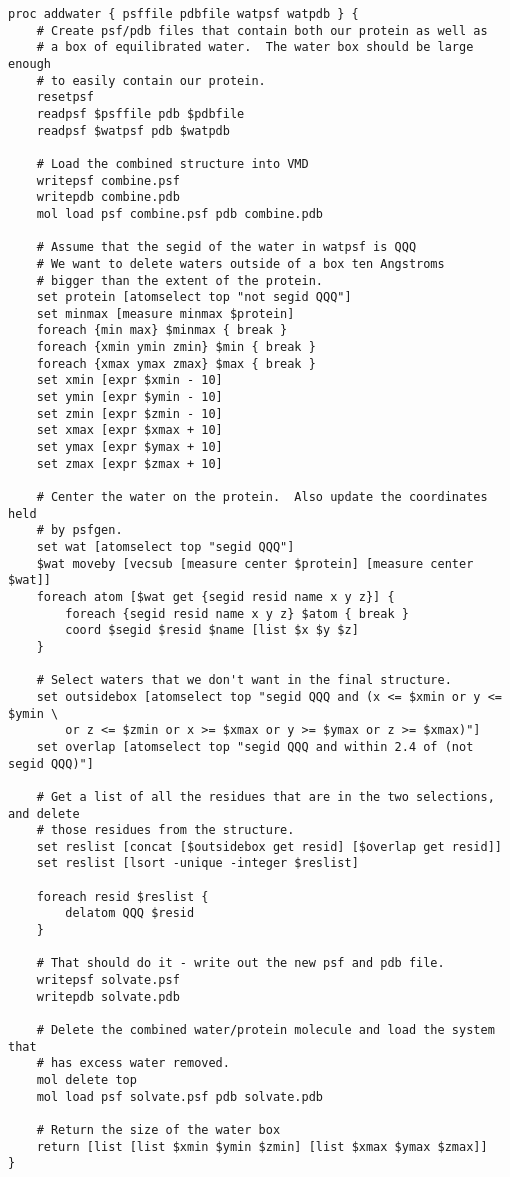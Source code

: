 \begin{verbatim}
proc addwater { psffile pdbfile watpsf watpdb } {
	# Create psf/pdb files that contain both our protein as well as
	# a box of equilibrated water.  The water box should be large enough
	# to easily contain our protein.
	resetpsf
	readpsf $psffile pdb $pdbfile
	readpsf $watpsf pdb $watpdb

	# Load the combined structure into VMD   
	writepsf combine.psf
	writepdb combine.pdb
	mol load psf combine.psf pdb combine.pdb

	# Assume that the segid of the water in watpsf is QQQ
	# We want to delete waters outside of a box ten Angstroms
	# bigger than the extent of the protein. 
	set protein [atomselect top "not segid QQQ"]
	set minmax [measure minmax $protein]
	foreach {min max} $minmax { break }
	foreach {xmin ymin zmin} $min { break }
	foreach {xmax ymax zmax} $max { break }
    set xmin [expr $xmin - 10]
    set ymin [expr $ymin - 10]
    set zmin [expr $zmin - 10]
    set xmax [expr $xmax + 10]
    set ymax [expr $ymax + 10]
    set zmax [expr $zmax + 10]

	# Center the water on the protein.  Also update the coordinates held
	# by psfgen.
	set wat [atomselect top "segid QQQ"]
	$wat moveby [vecsub [measure center $protein] [measure center $wat]]
	foreach atom [$wat get {segid resid name x y z}] {
		foreach {segid resid name x y z} $atom { break }
		coord $segid $resid $name [list $x $y $z]
	}

	# Select waters that we don't want in the final structure.
	set outsidebox [atomselect top "segid QQQ and (x <= $xmin or y <= $ymin \
		or z <= $zmin or x >= $xmax or y >= $ymax or z >= $xmax)"]
	set overlap [atomselect top "segid QQQ and within 2.4 of (not segid QQQ)"]

	# Get a list of all the residues that are in the two selections, and delete
	# those residues from the structure.
	set reslist [concat [$outsidebox get resid] [$overlap get resid]]
	set reslist [lsort -unique -integer $reslist]

	foreach resid $reslist {
		delatom QQQ $resid
	}

	# That should do it - write out the new psf and pdb file. 
	writepsf solvate.psf 
	writepdb solvate.pdb

	# Delete the combined water/protein molecule and load the system that
	# has excess water removed.
	mol delete top
	mol load psf solvate.psf pdb solvate.pdb

	# Return the size of the water box
	return [list [list $xmin $ymin $zmin] [list $xmax $ymax $zmax]]
}
\end{verbatim}

